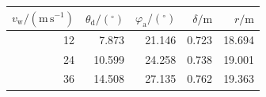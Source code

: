 \begin{tabular}{rrrrr}
\toprule
$v_{\mathrm w}/(\mathrm{m\,s^{-1}})$ & $\theta_{\mathrm d}/(^\circ)$ & $\varphi_{\mathrm a}/(^\circ)$ & $\delta/\mathrm m$ & $r/\mathrm m$ \\
\midrule
12 & 7.873 & 21.146 & 0.723 & 18.694 \\
24 & 10.599 & 24.258 & 0.738 & 19.001 \\
36 & 14.508 & 27.135 & 0.762 & 19.363 \\
\bottomrule
\end{tabular}

